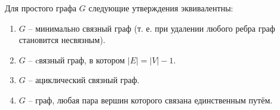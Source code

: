 \begin{theorem}
    Для простого графа $G$ следующие утверждения эквивалентны:
    \begin{enumerate}
        \item $G$ -- минимально связный граф (т. е. при удалении любого ребра граф становится несвязным).

        \item $G$ -- cвязный граф, в котором $|E| = |V| - 1.$

        \item $G$ -- ациклический связный граф.

        \item $G$ -- граф, любая пара вершин которого связана единственным путём.
    \end{enumerate}
\end{theorem}

